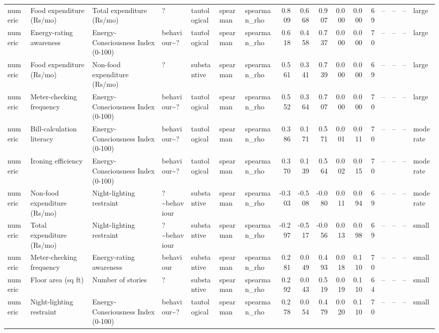 \begin{table}
\begin{tabular}{lllllllrrrrrrrrrl}
numeric & Food expenditure (Rs/mo) & Total expenditure (Rs/mo) & ? & tautological & spearman & spearman\_rho & 0.809 & 0.668 & 0.907 & 0.000 & 0.000 & 69 & -- & -- & -- & large \\
numeric & Energy-rating awareness & Energy-Consciousness Index (0-100) & behaviour\textasciitilde ? & tautological & spearman & spearman\_rho & 0.618 & 0.458 & 0.737 & 0.000 & 0.000 & 70 & -- & -- & -- & large \\
numeric & Food expenditure (Rs/mo) & Non-food expenditure (Rs/mo) & ? & substantive & spearman & spearman\_rho & 0.561 & 0.341 & 0.739 & 0.000 & 0.000 & 69 & -- & -- & -- & large \\
numeric & Meter-checking frequency & Energy-Consciousness Index (0-100) & behaviour\textasciitilde ? & tautological & spearman & spearman\_rho & 0.552 & 0.364 & 0.707 & 0.000 & 0.000 & 70 & -- & -- & -- & large \\
numeric & Bill-calculation literacy & Energy-Consciousness Index (0-100) & behaviour\textasciitilde ? & tautological & spearman & spearman\_rho & 0.386 & 0.171 & 0.571 & 0.001 & 0.011 & 70 & -- & -- & -- & moderate \\
numeric & Ironing efficiency & Energy-Consciousness Index (0-100) & behaviour\textasciitilde ? & tautological & spearman & spearman\_rho & 0.370 & 0.139 & 0.564 & 0.002 & 0.015 & 70 & -- & -- & -- & moderate \\
numeric & Non-food expenditure (Rs/mo) & Night-lighting restraint & ?\textasciitilde behaviour & substantive & spearman & spearman\_rho & -0.303 & -0.508 & -0.080 & 0.011 & 0.094 & 69 & -- & -- & -- & moderate \\
numeric & Total expenditure (Rs/mo) & Night-lighting restraint & ?\textasciitilde behaviour & substantive & spearman & spearman\_rho & -0.297 & -0.517 & -0.056 & 0.013 & 0.098 & 69 & -- & -- & -- & small \\
numeric & Meter-checking frequency & Energy-rating awareness & behaviour & substantive & spearman & spearman\_rho & 0.281 & 0.049 & 0.493 & 0.018 & 0.110 & 70 & -- & -- & -- & small \\
numeric & Floor area (sq ft) & Number of stories & ? & substantive & spearman & spearman\_rho & 0.292 & 0.043 & 0.519 & 0.019 & 0.110 & 64 & -- & -- & -- & small \\
numeric & Night-lighting restraint & Energy-Consciousness Index (0-100) & behaviour\textasciitilde ? & tautological & spearman & spearman\_rho & 0.278 & 0.054 & 0.479 & 0.020 & 0.110 & 70 & -- & -- & -- & small \\

\end{tabular}
\end{table}

